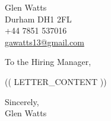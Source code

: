 \documentclass[11pt,a4paper]{article}
\begin{document}
\begin{flushright}
    Glen Watts \\
    Durham DH1 2FL \\
    +44 7851 537016 \\
    \href{mailto:gawatts13@gmail.com}{gawatts13@gmail.com}
\end{flushright}

\vspace{1em}

\begin{flushleft}
    To the Hiring Manager,
\end{flushleft}

\vspace{1em}

(( LETTER_CONTENT ))

\vspace{2em}

\begin{flushleft}
    Sincerely, \\
    \vspace{2em}
    Glen Watts
\end{flushleft}
\end{document}
